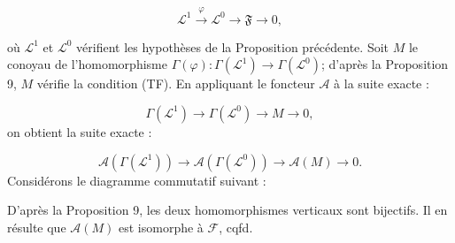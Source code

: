 \begin{equation*}
\mathcal{L}^{1} \stackrel{\varphi}{\longrightarrow} \mathcal{L}^{0} \to \mathfrak{F} \to 0, 
\end{equation*}


 où $\mathcal{L}^1$ et $\mathcal{L}^0$ vérifient les hypothèses de la Proposition précédente. Soit $M$ le conoyau de l'homomorphisme $\Gamma(\varphi): \Gamma(\mathcal{L}^1) \to \Gamma(\mathcal{L}^0)$; d'après la Proposition 9, $M$ vérifie la condition (TF). En appliquant le foncteur $\mathcal{A}$ à la suite exacte :

\begin{equation*}
\Gamma(\mathcal{L}^1) \to \Gamma(\mathcal{L}^0) \to M \to 0,
\end{equation*}
on obtient la suite exacte :

\begin{equation*}
\mathcal{A}(\Gamma(\mathcal{L}^1)) \to \mathcal{A}(\Gamma(\mathcal{L}^0)) \to \mathcal{A}(M) \to 0.
\end{equation*}
Considérons le diagramme commutatif suivant :

\begin{center}
\end{center}
D'après la Proposition 9, les deux homomorphismes verticaux sont bijectifs. Il en résulte que $\mathcal{A}(M)$ est isomorphe à $\mathcal{F}$, cqfd.


